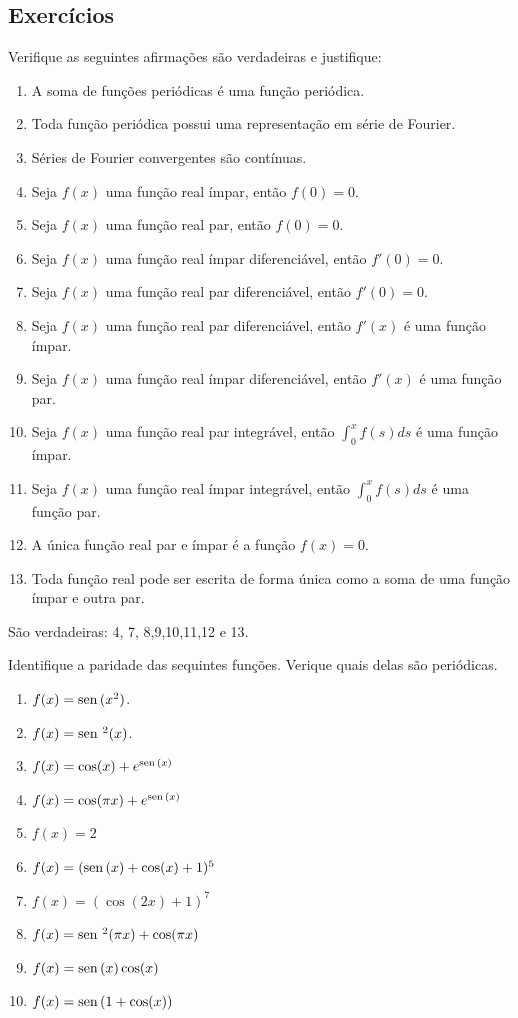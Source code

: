 \subsection*{Exercícios}
 \begin{exer}Verifique as seguintes afirmações são verdadeiras e justifique:
\begin{enumerate} 
\item A soma de funções periódicas é uma função periódica.
\item Toda função periódica possui uma representação em série de Fourier.
\item Séries de Fourier convergentes são contínuas.
\item Seja $f(x)$ uma função real ímpar, então $f(0)=0$.
\item Seja $f(x)$ uma função real par, então $f(0)=0$.
\item Seja $f(x)$ uma função real ímpar diferenciável, então $f'(0)=0$.
\item Seja $f(x)$ uma função real par diferenciável, então $f'(0)=0$.
\item Seja $f(x)$ uma função real par diferenciável, então $f'(x)$ é uma função ímpar.
\item Seja $f(x)$ uma função real ímpar diferenciável, então $f'(x)$ é uma função par.
\item Seja $f(x)$ uma função real par integrável, então $\int_0^xf(s)ds$ é uma função ímpar.
\item Seja $f(x)$ uma função real ímpar integrável, então $\int_0^xf(s)ds$ é uma função par.
\item A única função real par e ímpar é a função $f(x)=0$.
\item Toda função real pode ser escrita de forma única como a soma de uma função ímpar e outra par.
\end{enumerate}
\end{exer}
\begin{resp} São verdadeiras: 4, 7, 8,9,10,11,12 e 13. 
\end{resp}
\begin{exer}Identifique a paridade das sequintes funções. Verique quais delas são periódicas. 
\begin{enumerate} 
\item $f(x)=\operatorname{sen}\,(x^2)$.
\item $f(x)=\operatorname{sen}\,^2(x)$.
\item $f(x)=\cos(x)+e^{\operatorname{sen}\,(x)}$
\item $f(x)=\cos(\pi x)+e^{\operatorname{sen}\,(x)}$
\item $f(x)=2$
\item $f(x)=(\operatorname{sen}\,(x)+\cos(x)+1)^5$
\item $f(x)=(\cos(2x)+1)^7$
\item $f(x)=\operatorname{sen}\,^2(\pi x)+\cos(\pi x)$
\item $f(x)=\operatorname{sen}\,(x)\cos(x)$
\item $f(x)=\operatorname{sen}\,(1+\cos(x))$
\end{enumerate}
\end{exer}
